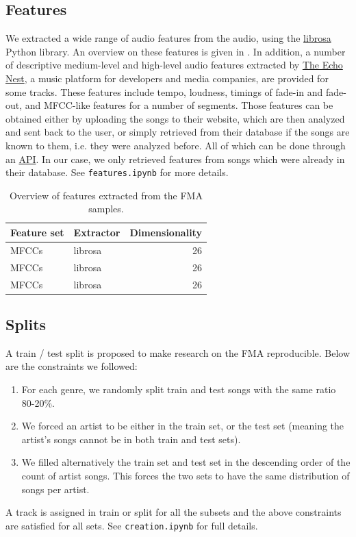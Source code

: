 \documentclass{article}
\begin{document}
\subsection{Features} %

We extracted a wide range of audio features from the audio, using the \href{https://github.com/librosa/librosa}{librosa} Python library. An overview
on these features is given in .
In addition, a number of descriptive medium-level and high-level audio features extracted by \href{http://the.echonest.com/}{The Echo Nest}, a music platform for developers and media companies, are provided for some tracks. These features include tempo, loudness, timings of fade-in and fade-out, and MFCC-like features for a number of segments.
Those features can be obtained either by uploading the songs to their website, which are then analyzed and sent back to the user, or simply retrieved from their database if the songs are known to them, i.e. they were analyzed before. All of which can be done through an \href{http://developer.echonest.com}{API}. In our case, we only retrieved features from songs which were already in their database.
See \texttt{features.ipynb} for more details.

\begin{table}
	\centering
	\begin{tabular}{llr}
		\toprule
		Feature set & Extractor & Dimensionality \\
		\midrule
		MFCCs \cite{mfcc} & librosa & 26 \\
		MFCCs \cite{mfcc} & librosa & 26 \\
		MFCCs \cite{mfcc} & librosa & 26 \\
		\bottomrule
	\end{tabular}
	\caption{Overview of features extracted from the FMA samples.}
	\label{tab:features}
\end{table}

\subsection{Splits}

A train / test split is proposed to make research on the FMA reproducible.
Below are the constraints we followed:
\begin{enumerate}
	\item For each genre, we randomly split train and test songs with the same ratio 80-20\%.
	\item We forced an artist to be either in the train set, or the test set (meaning the artist's songs cannot be in both train and test sets).
	\item We filled alternatively the train set and test set in the descending order of the count of artist songs. This forces the two sets to have the same distribution of songs per artist.
\end{enumerate}
A track is assigned in train or split for all the subsets and the above constraints are satisfied for all sets. See \texttt{creation.ipynb} for full details.
\end{document}
